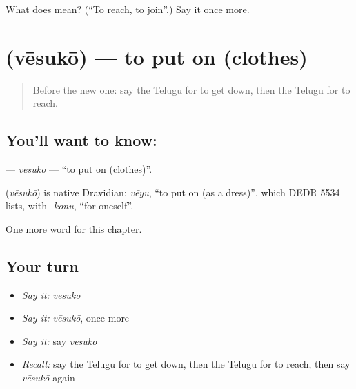 \begin{tcolorbox}[breakable,colback=teal!4,colframe=teal!35!black,title={Before you move on}]
What does  mean? (\textquotedblleft{}To reach, to join\textquotedblright{}.) Say it once more.
\end{tcolorbox}
\section[\texorpdfstring{\te{వేసుకో} (vēsukō)}{వేసుకో (vēsukō)}]{ (vēsukō) — to put on (clothes)}

\label{lesson:TE-C146-vesuko}



\begin{quote}
Before the new one: say the Telugu for to get down, then the Telugu for to reach.
\end{quote}

\subsection*{You'll want to know: }
\textbf{} — \emph{vēsukō} — \textquotedblleft{}to put on (clothes)\textquotedblright{}.

\begin{cousinweb}
\textbf{} (\emph{vēsukō}) is native Dravidian: \emph{vēyu}, \textquotedblleft{}to put on (as a dress)\textquotedblright{}, which DEDR 5534 lists, with \emph{-konu}, \textquotedblleft{}for oneself\textquotedblright{}.
\end{cousinweb}

\begin{grammarlens}[title={What you've built}]
One more word for this chapter.
\end{grammarlens}

\subsection*{Your turn}
\begin{itemize}
\raggedright
  \item \emph{Say it:} \emph{vēsukō}
  \item \emph{Say it:} \emph{vēsukō}, once more
  \item \emph{Say it:} say \emph{vēsukō}
  \item \emph{Recall:} say the Telugu for to get down, then the Telugu for to reach, then say \emph{vēsukō} again
\end{itemize}

